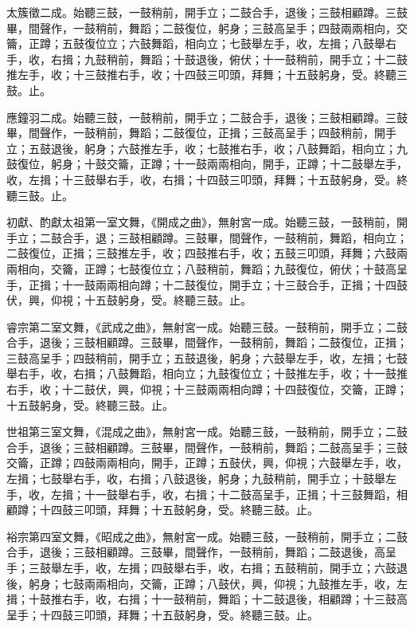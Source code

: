 \begin{pinyinscope}
 太簇徵二成。始聽三鼓，一鼓稍前，開手立；二鼓合手，退後；三鼓相顧蹲。三鼓畢，間聲作，一鼓稍前，舞蹈；二鼓復位，躬身；三鼓高呈手；四鼓兩兩相向，交籥，正蹲；五鼓復位立；六鼓舞蹈，相向立；七鼓舉左手，收，左揖；八鼓舉右手，收，右揖；九鼓稍前，舞蹈；十鼓退後，俯伏；十一鼓稍前，開手立；十二鼓推左手，收；十三鼓推右手，收；十四鼓三叩頭，拜舞；十五鼓躬身，受。終聽三鼓。止。



 應鐘羽二成。始聽三鼓，一鼓稍前，開手立；二鼓合手，退後；三鼓相顧蹲。三鼓畢，間聲作，一鼓稍前，舞蹈；二鼓復位，正揖；三鼓高呈手；四鼓稍前，開手立；五鼓退後，躬身；六鼓推左手，收；七鼓推右手，收；八鼓舞蹈，相向立；九鼓復位，躬身；十鼓交籥，正蹲；十一鼓兩兩相向，開手，正蹲；十二鼓舉左手，收，左揖；十三鼓舉右手，收，右揖；十四鼓三叩頭，拜舞；十五鼓躬身，受。終聽三鼓。止。



 初獻、酌獻太祖第一室文舞，《開成之曲》，無射宮一成。始聽三鼓，一鼓稍前，開手立；二鼓合手，退；三鼓相顧蹲。三鼓畢，間聲作，一鼓稍前，舞蹈，相向立；二鼓復位，正揖；三鼓推左手，收；四鼓推右手，收；五鼓三叩頭，拜舞；六鼓兩兩相向，交籥，正蹲；七鼓復位立；八鼓稍前，舞蹈；九鼓復位，俯伏；十鼓高呈手，正揖；十一鼓兩兩相向蹲；十二鼓復位，開手立；十三鼓合手，正揖；十四鼓伏，興，仰視；十五鼓躬身，受。終聽三鼓。止。



 睿宗第二室文舞，《武成之曲》，無射宮一成。始聽三鼓。一鼓稍前，開手立；二鼓合手，退後；三鼓相顧蹲。三鼓畢，間聲作，一鼓稍前，舞蹈；二鼓復位，正揖；三鼓高呈手；四鼓稍前，開手立；五鼓退後，躬身；六鼓舉左手，收，左揖；七鼓舉右手，收，右揖；八鼓舞蹈，相向立；九鼓復位立；十鼓推左手，收；十一鼓推右手，收；十二鼓伏，興，仰視；十三鼓兩兩相向蹲；十四鼓復位，交籥，正蹲；十五鼓躬身，受。終聽三鼓。止。



 世祖第三室文舞，《混成之曲》，無射宮一成。始聽三鼓，一鼓稍前，開手立；二鼓合手，退後；三鼓相顧蹲。三鼓畢，間聲作，一鼓稍前，舞蹈；二鼓高呈手；三鼓交籥，正蹲；四鼓兩兩相向，開手，正蹲；五鼓伏，興，仰視；六鼓舉左手，收，左揖；七鼓舉右手，收，右揖；八鼓退後，躬身；九鼓稍前，開手立；十鼓舉左手，收，左揖；十一鼓舉右手，收，右揖；十二鼓高呈手，正揖；十三鼓舞蹈，相顧蹲；十四鼓三叩頭，拜舞；十五鼓躬身，受。終聽三鼓。止。



 裕宗第四室文舞，《昭成之曲》，無射宮一成。始聽三鼓，一鼓稍前，開手立；二鼓合手，退後；三鼓相顧蹲。三鼓畢，間聲作，一鼓稍前，舞蹈；二鼓退後，高呈手；三鼓舉左手，收，左揖；四鼓舉右手，收，右揖；五鼓稍前，開手立；六鼓退後，躬身；七鼓兩兩相向，交籥，正蹲；八鼓伏，興，仰視；九鼓推左手，收，左揖；十鼓推右手，收，右揖；十一鼓稍前，舞蹈；十二鼓退後，相顧蹲；十三鼓高呈手；十四鼓三叩頭，拜舞；十五鼓躬身，受。終聽三鼓。止。




\end{pinyinscope}
